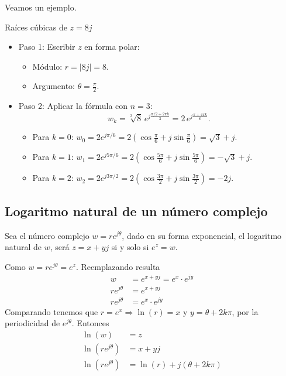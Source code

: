 Veamos un ejemplo.
\begin{example}
Raíces cúbicas de \( z = 8j \)
\begin{itemize}
  \item Paso 1: Escribir \( z \) en forma polar:
    \begin{itemize}
      \item Módulo: \( r = |8j| = 8 \).
      \item Argumento: \( \theta = \frac{\pi}{2} \).
    \end{itemize}
  \item Paso 2: Aplicar la fórmula con \( n = 3 \):
    \[
    w_k = \sqrt[3]{8} \, e^{j \frac{\pi/2 + 2\pi k}{3}} = 2 \, e^{j \frac{\pi + 4\pi k}{6}}.
    \]
    \begin{itemize}
      \item Para \( k = 0 \): \( w_0 = 2 e^{j\pi/6} = 2\left( \cos\frac{\pi}{6} + j\sin\frac{\pi}{6} \right) = \sqrt{3} + j \).
      \item Para \( k = 1 \): \( w_1 = 2 e^{j5\pi/6} = 2\left( \cos\frac{5\pi}{6} + j\sin\frac{5\pi}{6} \right) = -\sqrt{3} + j \).
      \item Para \( k = 2 \): \( w_2 = 2 e^{j3\pi/2} = 2\left( \cos\frac{3\pi}{2} + j\sin\frac{3\pi}{2} \right) = -2j \).
    \end{itemize}
\end{itemize}
\end{example}

\subsection{Logaritmo natural de un número complejo}

Sea el número complejo $w=re^{j\theta}$, dado en su forma exponencial, el logaritmo natural de $w$, será $z=x+yj$ si y solo si $e^z=w$.

Como $w=re^{j\theta} = e^z$. Reemplazando resulta
\begin{align*}
  w &= e^{x+yj}=e^x\cdot e^{jy} \\ 
  re^{j\theta} &= e^{x+yj} \\ 
  re^{j\theta} &=e^x\cdot e^{jy}
\end{align*}
Comparando tenemos que $r=e^{x}\Rightarrow \ln(r)=x$ y $y=\theta + 2k\pi$, por la periodicidad de $e^{j\theta}$. Entonces
\begin{align*}
  \ln(w)&=z \\ 
  \ln(re^{j\theta}) &= x+yj \\ 
  \ln(re^{j\theta}) &= \ln(r) + j(\theta + 2k\pi)
\end{align*}
